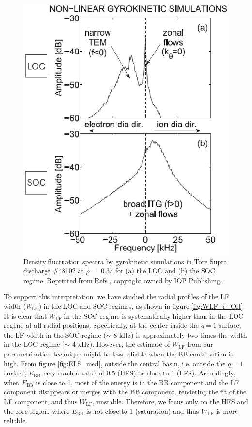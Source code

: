 \begin{figure}[h]
\begin{centering}
\includegraphics[scale=0.8]{fig_simu_spec_TEM_ITG_gray.eps}
\par\end{centering}
\caption{Density fluctuation spectra by gyrokinetic simulations in Tore Supra discharge \#48102 at $\rho = $ 0.37 for (a) the LOC and (b) the SOC regime. Reprinted from Refs \cite{Arnichand_2016_PPCF}, copyright owned by IOP Publishing.}
\label{fig:simu_spec}
\end{figure}


To support this interpretation, we have studied the radial profiles of the LF width ($W_\mathrm{LF}$) in the LOC and SOC regimes, as shown in figure \ref{fig:WLF_r_OH}. It is clear that $W_\mathrm{LF}$ in the SOC regime is systematically higher than in the LOC regime at all radial positions. Specifically, at the center inside the $q = 1$ surface, the LF width in the SOC regime ($\sim$ 8 kHz) is approximately two times the width in the LOC regime ($\sim$ 4 kHz). However, the estimate of $W_\mathrm{LF}$ from our parametrization technique might be less reliable when the BB contribution is high. From figure \ref{fig:ELS_med}, outside the central basin, i.e. outside the $q = 1$ surface, $E_\mathrm{BB}$ may reach a value of 0.5 (HFS) or close to 1 (LFS). Accordingly, when $E_\mathrm{BB}$ is close to 1, most of the energy is in the BB component and the LF component disappears or merges with the BB component, rendering the fit of the LF component, and thus $W_\mathrm{LF}$, unstable. Therefore, we focus only on the HFS and the core region, where $E_\mathrm{BB}$ is not close to 1 (saturation) and thus $W_\mathrm{LF}$ is more reliable.


